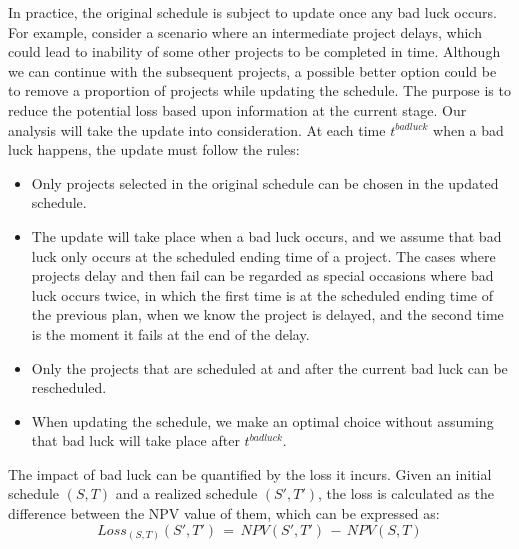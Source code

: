 \documentclass[final,3p,times]{elsarticle}
\begin{document}
	In practice, the original schedule is subject to update once any bad luck occurs. For example, consider a scenario where an intermediate project delays, which could lead to inability of some other projects to be completed in time. Although we can continue with the subsequent projects, a possible better option could be to remove a proportion of projects while updating the schedule. The purpose is to reduce the potential loss based upon information at the current stage. Our analysis will take the update into consideration. At each time $t^{badluck}$ when a bad luck happens, the update must follow the rules:
	\begin{itemize}
		\item Only projects selected in the original schedule can be chosen in the updated schedule.
		\item The update will take place when a bad luck occurs, and we assume that bad luck only occurs at the scheduled ending time of a project. The cases where projects delay and then fail can be regarded as special occasions where bad luck occurs twice, in which the first time is at the scheduled ending time of the previous plan, when we know the project is delayed, and the second time is the moment it fails at the end of the delay.
		\item Only the projects that are scheduled at and after the current bad luck can be rescheduled.
		\item When updating the schedule, we make an optimal choice without assuming that bad luck will take place after $t^{badluck}$. 
	\end{itemize}
	
	The impact of bad luck can be quantified by the loss it incurs. Given an initial schedule $(S,T)$ and a realized schedule $(S',T')$, the loss is calculated as the difference between the NPV value of them, which can be expressed as:
	\begin{equation}
		Loss_{(S,T)}(S',T')\,=\, NPV(S',T')\,-\,NPV(S,T)
	\end{equation}
	
\end{document}
